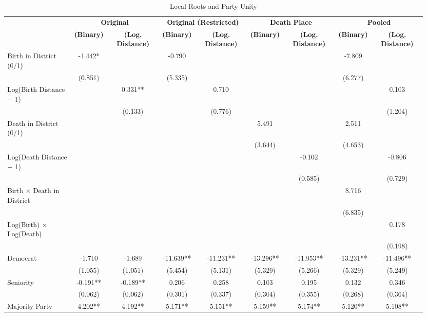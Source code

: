 \begin{table}[t]
\caption{Local Roots and Party Unity} 
\fontsize{9.0pt}{11.0pt}\selectfont
\begin{tabular*}{\linewidth}{@{\extracolsep{\fill}}lcccccccc}
\toprule
 & \multicolumn{2}{c}{{\bfseries \textbf{Original}}} & \multicolumn{2}{c}{{\bfseries \textbf{Original (Restricted)}}} & \multicolumn{2}{c}{{\bfseries \textbf{Death Place}}} & \multicolumn{2}{c}{{\bfseries \textbf{Pooled}}} \\ 
\cmidrule(lr){2-3} \cmidrule(lr){4-5} \cmidrule(lr){6-7} \cmidrule(lr){8-9}
{\bfseries  } & {\bfseries (Binary)} & {\bfseries (Log. Distance)} & {\bfseries (Binary)} & {\bfseries (Log. Distance)} & {\bfseries (Binary)} & {\bfseries (Log. Distance)} & {\bfseries (Binary)} & {\bfseries (Log. Distance)} \\ 
\midrule\addlinespace[2.5pt]
Birth in District (0/1) & -1.442* &  & -0.790 &  &  &  & -7.809 &  \\ 
 & (0.851) &  & (5.335) &  &  &  & (6.277) &  \\ 
Log(Birth Distance + 1) &  & 0.331** &  & 0.710 &  &  &  & 0.103 \\ 
 &  & (0.133) &  & (0.776) &  &  &  & (1.204) \\ 
Death in District (0/1) &  &  &  &  & 5.491 &  & 2.511 &  \\ 
 &  &  &  &  & (3.644) &  & (4.653) &  \\ 
Log(Death Distance + 1) &  &  &  &  &  & -0.102 &  & -0.806 \\ 
 &  &  &  &  &  & (0.585) &  & (0.729) \\ 
Birth × Death in District &  &  &  &  &  &  & 8.716 &  \\ 
 &  &  &  &  &  &  & (6.835) &  \\ 
Log(Birth) × Log(Death) &  &  &  &  &  &  &  & 0.178 \\ 
 &  &  &  &  &  &  &  & (0.198) \\ 
Democrat & -1.710 & -1.689 & -11.639** & -11.231** & -13.296** & -11.953** & -13.231** & -11.496** \\ 
 & (1.055) & (1.051) & (5.454) & (5.131) & (5.329) & (5.266) & (5.329) & (5.249) \\ 
Seniority & -0.191** & -0.189** & 0.206 & 0.258 & 0.103 & 0.195 & 0.132 & 0.346 \\ 
 & (0.062) & (0.062) & (0.301) & (0.337) & (0.304) & (0.355) & (0.268) & (0.364) \\ 
Majority Party & 4.202** & 4.192** & 5.171** & 5.151** & 5.159** & 5.174** & 5.120** & 5.108** \\ 

\end{tabular*}
\end{table}
